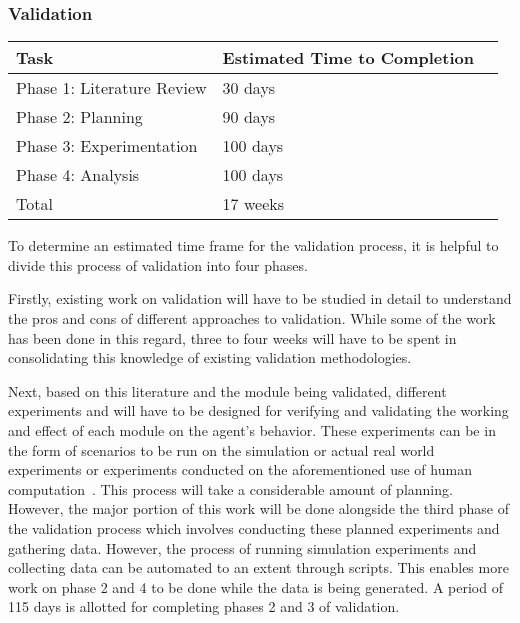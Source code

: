 \subsubsection{Validation}
\label{CFW:ValidationTimeFrame}

\begin{table}[tbp]
\centering
{} %
\begin{tabular}{p{2.5in}   p{1.25in}   p{1.25in}} %
\hline\hline %
Task & Estimated Time to Completion \\
\hline
Phase 1: Literature Review & 30 days \\[3pt]
Phase 2: Planning & 90 days \\[3pt]
Phase 3: Experimentation & 100 days \\[3pt]
Phase 4: Analysis & 100 days \\[3pt]
\hline
Total & 17 weeks \\[3pt]
\bottomrule
\end{tabular}
\label{tab:Validation}
\end{table}

To determine an estimated time frame for the validation process, it is helpful to divide this process of validation into four phases.

Firstly, existing work on validation will have to be studied in detail to understand the pros and cons of different approaches to validation. While some of the work has been done in this regard, three to four weeks will have to be spent in consolidating this knowledge of existing validation methodologies.

Next, based on this literature and the module being validated, different experiments and will have to be designed for verifying and validating the working and effect of each module on the agent's behavior. These experiments can be in the form of scenarios to be run on the simulation or actual real world experiments or experiments conducted on the aforementioned use of human computation~\cite{Pengfei:2011us}. This process will take a considerable amount of planning. However, the major portion of this work will be done alongside the third phase of the validation process which involves conducting these planned experiments and gathering data.  However, the process of running simulation experiments and collecting data can be automated to an extent through scripts. This enables more work on phase 2 and 4 to be done while the data is being generated. A period of 115 days is allotted for completing phases 2 and 3 of validation.

